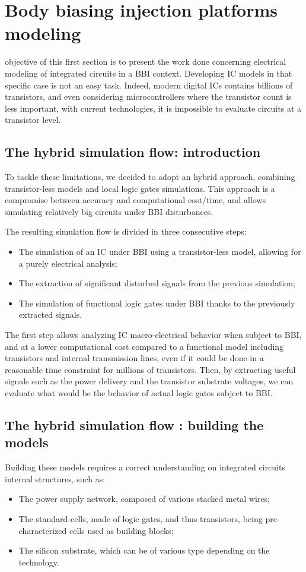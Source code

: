 
\section{Body biasing injection platforms modeling}
 objective of this first section is to present the work done concerning electrical modeling of integrated circuits in a BBI context.
Developing IC models in that specific case is not an easy task.
Indeed, modern digital ICs contains billions of transistors, and even considering microcontrollers where the transistor count is less important, with current technologies, it is impossible to evaluate circuits at a transistor level.

	\subsection{The hybrid simulation flow: introduction}
	To tackle these limitations, we decided to adopt an hybrid approach, combining transistor-less models and local logic gates simulations.
	This approach is a compromise between accuracy and computational cost/time, and allows simulating relatively big circuits under BBI disturbances.
	
	The resulting simulation flow is divided in three consecutive steps:
	\begin{itemize}
		\item The simulation of an IC under BBI using a transistor-less model, allowing for a purely electrical analysis;
		\item The extraction of significant disturbed signals from the previous simulation;
		\item The simulation of functional logic gates under BBI thanks to the previously extracted signals.
	\end{itemize}
	The first step allows analyzing IC macro-electrical behavior when subject to BBI, and at a lower computational cost compared to a functional model including transistors and internal transmission lines, even if it could be done in a reasonable time constraint for millions of transistors.
	Then, by extracting useful signals such as the power delivery and the transistor substrate voltages, we can evaluate what would be the behavior of actual logic gates subject to BBI.
	
	\subsection{The hybrid simulation flow : building the models}
	Building these models requires a correct understanding on integrated circuits internal structures, such as:
	\begin{itemize}
		\item The power supply network, composed of various stacked metal wires;
		\item The standard-cells, made of logic gates, and thus transistors, being pre-characterized cells used as building blocks;
		\item The silicon substrate, which can be of various type depending on the technology.
	\end{itemize}
	

